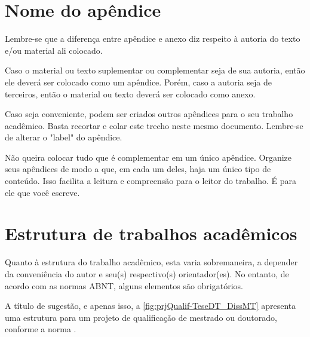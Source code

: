 

\begin{apendicesenv}
\partapendices




\chapter{Nome do apêndice} 			%
\label{chap:apendiceA}

Lembre-se que a diferença entre apêndice e anexo diz respeito à autoria do texto e/ou material ali colocado.

Caso o material ou texto suplementar ou complementar seja de sua autoria, então ele deverá ser colocado como um apêndice. Porém, caso a autoria seja de terceiros, então o material ou texto deverá ser colocado como anexo.

Caso seja conveniente, podem ser criados outros apêndices para o seu trabalho acadêmico. Basta recortar e colar este trecho neste mesmo documento. Lembre-se de alterar o "label"{} do apêndice.

Não queira colocar tudo que é complementar em um único apêndice. Organize seus apêndices de modo a que, em cada um deles, haja um único tipo de conteúdo. Isso facilita a leitura e compreensão para o leitor do trabalho. É para ele que você escreve.



\chapter{Estrutura de trabalhos acadêmicos}
\label{chap:apEstrTrabAcad}


Quanto à estrutura do trabalho acadêmico, esta varia sobremaneira, a depender da conveniência do autor e seu(s) respectivo(s) orientador(es). No entanto, de acordo com as normas ABNT, alguns elementos são obrigatórios.

A título de sugestão, e apenas isso, a \autoref{fig:prjQualif-TeseDT_DissMT} apresenta uma estrutura para um projeto de qualificação de mestrado ou doutorado, conforme a norma .



\end{apendicesenv}
